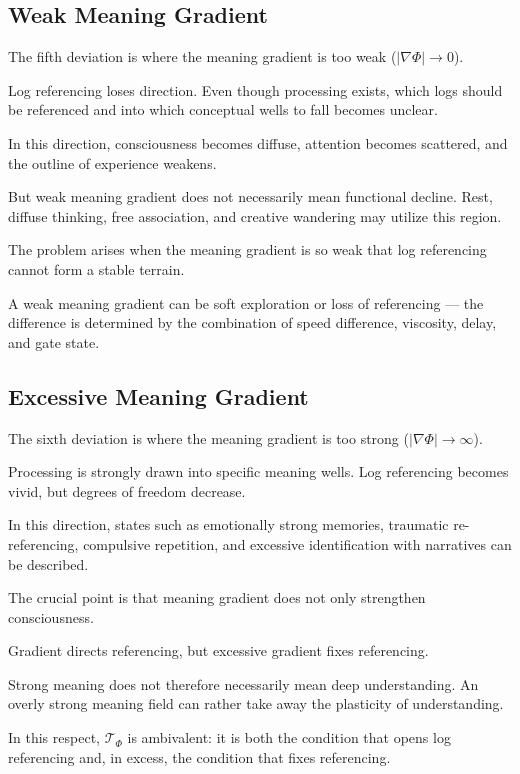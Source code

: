 \subsection{Weak Meaning Gradient}


The fifth deviation is where the meaning gradient is too weak ($|\nabla\Phi| \rightarrow 0$).

Log referencing loses direction. Even though processing exists, which logs should be referenced and into which conceptual wells to fall becomes unclear.

In this direction, consciousness becomes diffuse, attention becomes scattered, and the outline of experience weakens.

But weak meaning gradient does not necessarily mean functional decline. Rest, diffuse thinking, free association, and creative wandering may utilize this region.

The problem arises when the meaning gradient is so weak that log referencing cannot form a stable terrain.

A weak meaning gradient can be soft exploration or loss of referencing — the difference is determined by the combination of speed difference, viscosity, delay, and gate state.

\subsection{Excessive Meaning Gradient}


The sixth deviation is where the meaning gradient is too strong ($|\nabla\Phi| \rightarrow \infty$).

Processing is strongly drawn into specific meaning wells. Log referencing becomes vivid, but degrees of freedom decrease.

In this direction, states such as emotionally strong memories, traumatic re-referencing, compulsive repetition, and excessive identification with narratives can be described.

The crucial point is that meaning gradient does not only strengthen consciousness.

Gradient directs referencing, but excessive gradient fixes referencing.

Strong meaning does not therefore necessarily mean deep understanding. An overly strong meaning field can rather take away the plasticity of understanding.

In this respect, $\mathcal{T}_{\Phi}$ is ambivalent: it is both the condition that opens log referencing and, in excess, the condition that fixes referencing.

